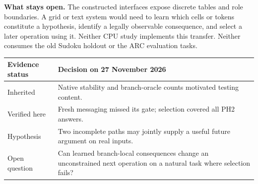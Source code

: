 \textbf{What stays open.} The constructed interfaces expose discrete tables and role boundaries. A grid or text system would need to learn which cells or tokens constitute a hypothesis, identify a legally observable consequence, and select a later operation using it. Neither CPU study implements this transfer. Neither consumes the old Sudoku holdout or the ARC evaluation tasks.
\par
\begin{tabular}{@{}p{.23\linewidth}p{.71\linewidth}@{}}
\toprule
Evidence status & Decision on 27 November 2026\\\midrule
Inherited & Native stability and branch-oracle counts motivated testing content.\\
Verified here & Fresh messaging missed its gate; selection covered all PH2 answers.\\
Hypothesis & Two incomplete paths may jointly supply a useful future argument on real inputs.\\
Open question & Can learned branch-local consequences change an unconstrained next operation on a natural task where selection fails?\\\bottomrule
\end{tabular}
